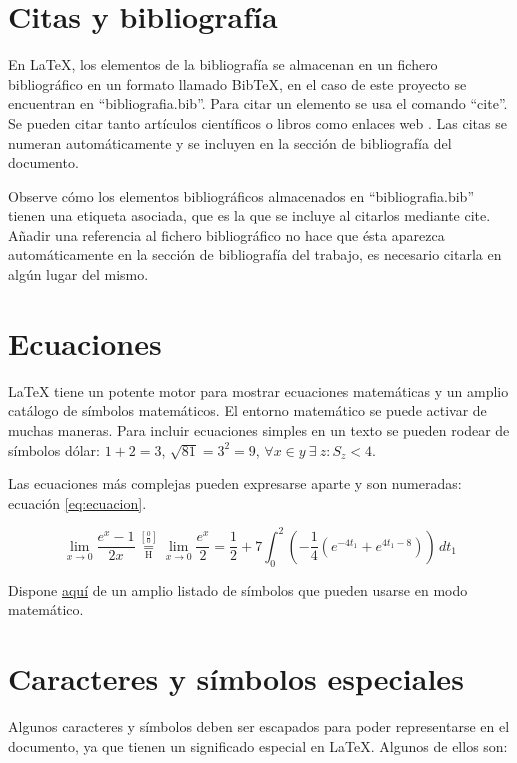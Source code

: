 \section{Citas y bibliografía}
En LaTeX, los elementos de la bibliografía se almacenan en un fichero bibliográfico en un formato llamado BibTeX, en el caso de este proyecto se encuentran en ``bibliografia.bib''. Para citar un elemento se usa el comando ``cite''. Se pueden citar tanto artículos científicos \cite{berners1994} o libros \cite{swales1994} como enlaces web \cite{webETSII}. Las citas se numeran automáticamente y se incluyen en la sección de bibliografía del documento.

Observe cómo los elementos bibliográficos almacenados en ``bibliografia.bib'' tienen una etiqueta asociada, que es la que se incluye al citarlos mediante cite. Añadir una referencia al fichero bibliográfico no hace que ésta aparezca automáticamente en la sección de bibliografía del trabajo, es necesario citarla en algún lugar del mismo.

\section{Ecuaciones}
LaTeX tiene un potente motor para mostrar ecuaciones matemáticas y un amplio catálogo de símbolos matemáticos. El entorno matemático se puede activar de muchas maneras. Para incluir ecuaciones simples en un texto se pueden rodear de símbolos dólar: $1 + 2 = 3$, $\sqrt{81} = 3^2 = 9$, $\forall x \in y~\exists~z : S_z < 4$.

Las ecuaciones más complejas pueden expresarse aparte y son numeradas: ecuación \ref{eq:ecuacion}.

\begin{equation}\label{eq:ecuacion}
\lim_{x\to 0}{\frac{e^x-1}{2x}}
 \overset{\left[\frac{0}{0}\right]}{\underset{\mathrm{H}}{=}}
 \lim_{x\to 0}{\frac{e^x}{2}}={\frac{1}{2}}
 +7 \int_0^2
  \left(
    -\frac{1}{4}\left(e^{-4t_1}+e^{4t_1-8}\right)
  \right)\,dt_1
\end{equation}

Dispone \href{http://www.yann-ollivier.org/latex/texsymbols.pdf}{aquí} de un amplio listado de símbolos que pueden usarse en modo matemático.

\section{Caracteres y símbolos especiales}
Algunos caracteres y símbolos deben ser escapados para poder representarse en el documento, ya que tienen un significado especial en LaTeX. Algunos de ellos son:

